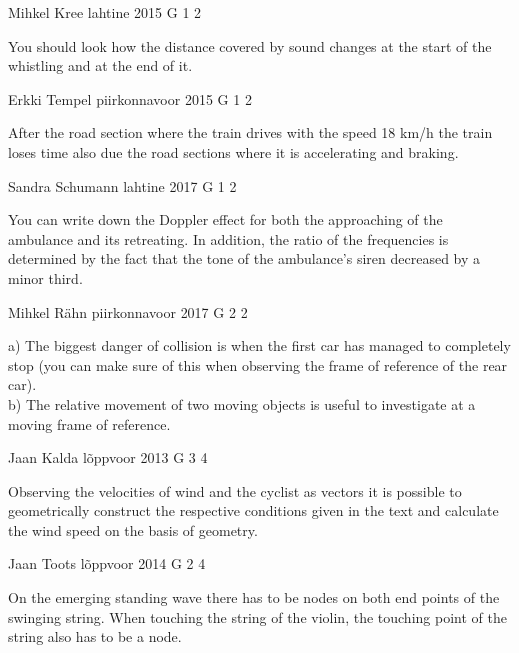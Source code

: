 \documentclass[11pt]{article}
\begin{document}
{Mihkel Kree} %
{lahtine} %
{2015} %
{G 1} %
{2} %
{

\ifEngHint
You should look how the distance covered by sound changes at the start of the whistling and at the end of it.
\fi
}

{Erkki Tempel} %
{piirkonnavoor} %
{2015} %
{G 1} %
{2} %
{

\ifEngHint
After the road section where the train drives with the speed 18 km/h the train loses time also due the road sections where it is accelerating and braking.
\fi
}

{Sandra Schumann} %
{lahtine} %
{2017} %
{G 1} %
{2} %
{

\ifEngHint
You can write down the Doppler effect for both the approaching of the ambulance and its retreating. In addition, the ratio of the frequencies is determined by the fact that the tone of the ambulance’s siren decreased by a minor third.
\fi
}

{Mihkel Rähn} %
{piirkonnavoor} %
{2017} %
{G 2} %
{2} %
{

\ifEngHint
a) The biggest danger of collision is when the first car has managed to completely stop (you can make sure of this when observing the frame of reference of the rear car).\\
b) The relative movement of two moving objects is useful to investigate at a moving frame of reference.
\fi
}

{Jaan Kalda} %
{lõppvoor} %
{2013} %
{G 3} %
{4} %
{

\ifEngHint
Observing the velocities of wind and the cyclist as vectors it is possible to geometrically construct the respective conditions given in the text and calculate the wind speed on the basis of geometry.
\fi
}

{Jaan Toots} %
{lõppvoor} %
{2014} %
{G 2} %
{4} %
{

\ifEngHint
On the emerging standing wave there has to be nodes on both end points of the swinging string. When touching the string of the violin, the touching point of the string also has to be a node.
\fi
}
\end{document}
